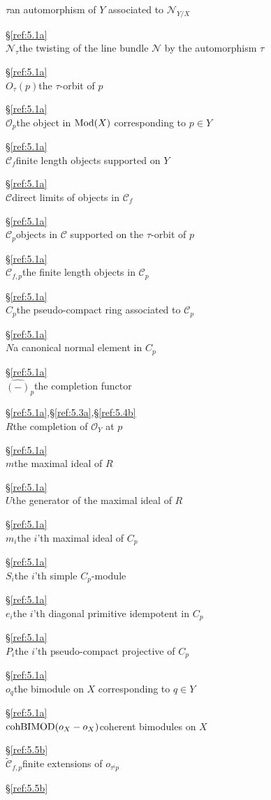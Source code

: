 \documentclass{amsproc}
\def\Cscr{{\mathcal C}}
\def\Nscr{{\mathcal N}}
\def\Oscr{{\mathcal O}}
\def\Mod{\mathop{\text{Mod}}}
\def\cohBIMOD{\mathop{\text{cohBIMOD}}}
\let\oldtext\text
\def\text#1{\oldtext{\upshape #1}}
\theoremstyle{definition}
\theoremstyle{remark}
\numberwithin{equation}{section}
\numberwithin{table}{section}
\numberwithin{figure}{section}
\begin{document}
\begin{tabbing}
$\tau$\>an automorphism of $Y$ associated to
$\Nscr_{Y/X}$\>\strut\hfill\S\ref{ref:5.1a}\>\\ 
$\Nscr_\tau$\>the twisting of the line bundle $\Nscr$ by the
automorphism $\tau$
\>\strut\hfill\S\ref{ref:5.1a}\>\\
$O_\tau(p)$\>the $\tau$-orbit of $p$
\>\strut\hfill\S\ref{ref:5.1a}\>\\
$\Oscr_p$\>the object in $\Mod(X)$ corresponding to $p\in
Y$\>\strut\hfill\S\ref{ref:5.1a}\>\\
$\Cscr_f$\>finite length objects supported on $Y$ \>\strut\hfill\S\ref{ref:5.1a}\>\\
$\Cscr$\>direct limits of objects in $\Cscr_f$
\>\strut\hfill\S\ref{ref:5.1a}\>\\
$\Cscr_p$\>objects in $\Cscr$ supported on the $\tau$-orbit of $p$
\>\strut\hfill\S\ref{ref:5.1a}\>\\
$\Cscr_{f,p}$\>the finite length objects in $\Cscr_p$
\>\strut\hfill\S\ref{ref:5.1a}\>\\
$C_p$\>the pseudo-compact ring associated to $\Cscr_p$
\>\strut\hfill\S\ref{ref:5.1a}\>\\
$N$\>a canonical normal element in $C_p$
\>\strut\hfill\S\ref{ref:5.1a}\>\\
$\hat{(-)}_p$\>the completion functor
\>\strut\hfill\S\ref{ref:5.1a},\S\ref{ref:5.3a},\S\ref{ref:5.4b}\>\\
$R$\>the completion of $\Oscr_Y$ at
$p$\>\strut\hfill\S\ref{ref:5.1a}\>\\ 
$m$\>the maximal ideal of $R$
\>\strut\hfill\S\ref{ref:5.1a}\>\\
$U$\>the generator of the maximal ideal of $R$
\>\strut\hfill\S\ref{ref:5.1a}\>\\
$m_i$\>the $i$'th maximal ideal of $C_p$
\>\strut\hfill\S\ref{ref:5.1a}\>\\
$S_i$\>the $i$'th simple $C_p$-module
\>\strut\hfill\S\ref{ref:5.1a}\>\\
$e_i$\>the $i$'th diagonal primitive idempotent in $C_p$
\>\strut\hfill\S\ref{ref:5.1a}\>\\
$P_i$\>the $i$'th pseudo-compact projective of $C_p$
\>\strut\hfill\S\ref{ref:5.1a}\>\\
$o_q$\>the bimodule on $X$ corresponding to $q\in Y$
\>\strut\hfill\S\ref{ref:5.1a}\>\\
$\cohBIMOD(o_X-o_X)$\>coherent bimodules on $X$
\>\strut\hfill\S\ref{ref:5.5b}\>\\
$\tilde{\Cscr}_{f,p}$\>finite extensions of $o_{\tau^i p}$
\>\strut\hfill\S\ref{ref:5.5b}\>\\

\end{tabbing}
\end{document}
